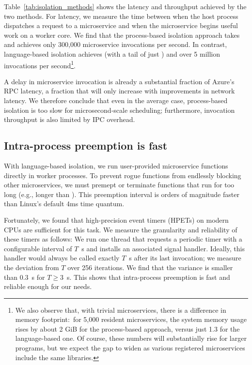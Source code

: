 Table~\ref{tab:isolation_methods} shows the latency and throughput achieved
by the two methods. For latency, we measure the time between when the host
process dispatches a request to a microservice and when the microservice begins
useful work on a worker core. We find that the process-based isolation approach
takes  and achieves only 300,000 microservice invocations per
second. In contrast, language-based isolation achieves  (with a tail
of just ) and over 5 million invocations per second\footnote{We also
observe that, with trivial microservices, there is a difference in memory
footprint:\ for 5,000 resident microservices, the system memory usage rises by about
2 GiB for the process-based approach, versus just 1.3 for the language-based one.  Of
course, these numbers will substantially rise for larger programs, but we expect the
gap to widen as various registered microservices include the same libraries.}.

A  delay in microservice invocation is already a substantial fraction of
Azure's  RPC latency, a fraction that will only increase with
improvements in network latency. We therefore conclude that even in the average case,
process-based isolation is too slow for microsecond-scale scheduling; furthermore,
invocation throughput is also limited by IPC overhead.

\subsection{Intra-process preemption is fast}
With language-based isolation, we run user-provided microservice functions
directly in worker processes. To prevent rogue functions from endlessly blocking
other microservices, we must premept or terminate functions that run for too
long (e.g., longer than ).  This preemption interval is orders of
magnitude faster than Linux's default 4ms time quantum.

Fortunately, we found that high-precision event timers (HPETs) on modern CPUs
are sufficient for this task. We measure the granularity and reliability of
these timers as follows: We run one thread that requests a periodic timer with a
configurable interval of $T$~\textmu{}s and installs an associated signal handler.
Ideally, this handler would always be called exactly $T$~\textmu{}s after its last
invocation; we measure the deviation from $T$ over 256 iterations.
We find that the variance
is smaller than 0.3~\textmu{}s for $T \ge 3$~\textmu{}s. This shows that
intra-process preemption is fast and reliable enough for our needs.
